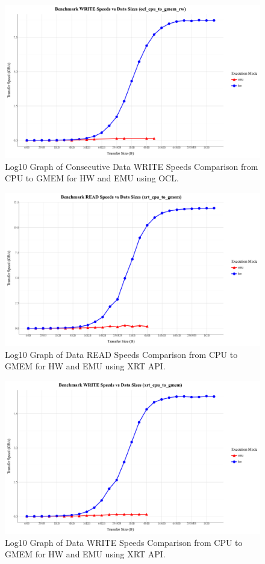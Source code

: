\begin{figure}[H]
    \centering
    \includegraphics[width=0.9\linewidth]{content/ocl_cpu_to_gmem_rw_WRITE.png}
    \caption{Log10 Graph of Consecutive Data WRITE Speeds Comparison from CPU to GMEM for HW and EMU using OCL.}
    \label{fig:enter-label}
\end{figure}

\begin{figure}[H]
    \centering
    \includegraphics[width=0.9\linewidth]{content/xrt_cpu_to_gmem_READ.png}
    \caption{Log10 Graph of Data READ Speeds Comparison from CPU to GMEM for HW and EMU using XRT API.}
    \label{fig:enter-label}
\end{figure}

\begin{figure}[H]
    \centering
    \includegraphics[width=0.9\linewidth]{content/xrt_cpu_to_gmem_WRITE.png}
    \caption{Log10 Graph of Data WRITE Speeds Comparison from CPU to GMEM for HW and EMU using XRT API.}
    \label{fig:enter-label}
\end{figure}

